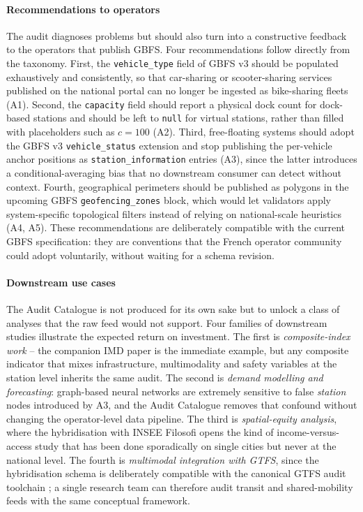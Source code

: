 \documentclass[a4paper,twoside]{article}
\begin{document}
\paragraph{Recommendations to operators}
The audit diagnoses problems but should also turn into a
constructive feedback to the operators that publish GBFS. Four
recommendations follow directly from the taxonomy. First, the
\texttt{vehicle\_type} field of GBFS v3 should be populated
exhaustively and consistently, so that car-sharing or
scooter-sharing services published on the national portal can no
longer be ingested as bike-sharing fleets (A1). Second, the
\texttt{capacity} field should report a physical dock count for
dock-based stations and should be left to \texttt{null} for
virtual stations, rather than filled with placeholders such as
$c = 100$ (A2). Third, free-floating systems should adopt the
GBFS v3 \texttt{vehicle\_status} extension and stop publishing
the per-vehicle anchor positions as \texttt{station\_information}
entries (A3), since the latter introduces a conditional-averaging
bias that no downstream consumer can detect without context.
Fourth, geographical perimeters should be published as polygons
in the upcoming GBFS \texttt{geofencing\_zones} block, which
would let validators apply system-specific topological filters
instead of relying on national-scale heuristics (A4, A5). These
recommendations are deliberately compatible with the current
GBFS specification: they are conventions that the French
operator community could adopt voluntarily, without waiting for
a schema revision.

\paragraph{Downstream use cases}
The Audit Catalogue is not produced for its own sake but to unlock
a class of analyses that the raw feed would not support. Four
families of downstream studies illustrate the expected return on
investment. The first is \emph{composite-index work} -- the
companion IMD paper \cite{Fosse2026imd} is the immediate
example, but any composite indicator that mixes infrastructure,
multimodality and safety variables at the station level inherits
the same audit. The second is \emph{demand modelling and
forecasting}: graph-based neural networks
\cite{Lin2018BSSGraph} are extremely sensitive to false
\emph{station} nodes introduced by A3, and the Audit Catalogue
removes that confound without changing the operator-level data
pipeline. The third is \emph{spatial-equity analysis}, where the
hybridisation with INSEE Filosofi opens the kind of
income-versus-access study that has been done sporadically on
single cities but never at the national level. The fourth is
\emph{multimodal integration with GTFS}, since the hybridisation
schema is deliberately compatible with the canonical GTFS audit
toolchain \cite{MobilityData2024Validator}; a single research
team can therefore audit transit and shared-mobility feeds with
the same conceptual framework.
\end{document}
